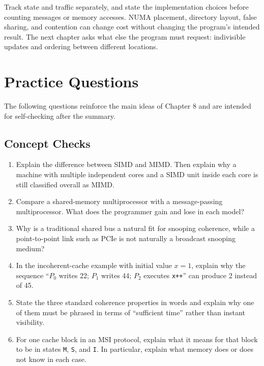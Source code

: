 Track state and traffic separately, and state the implementation choices before counting messages or memory accesses.
NUMA placement, directory layout, false sharing, and contention can change cost without changing the program's intended result.
The next chapter asks what else the program must request: indivisible updates and ordering between different locations.


\section{Practice Questions}\label{sec:ch8-practice}
The following questions reinforce the main ideas of Chapter 8 and are intended for self-checking after the summary.

\subsection*{Concept Checks}
\begin{enumerate}
    \setlength{\itemsep}{0.35em}
    \item Explain the difference between SIMD and MIMD. Then explain why a machine with multiple independent cores and a SIMD unit inside each core is still classified overall as MIMD\@.
    \item Compare a shared-memory multiprocessor with a message-passing multiprocessor.
    What does the programmer gain and lose in each model?
    \item Why is a traditional shared bus a natural fit for snooping coherence, while a point-to-point link such as PCIe is not naturally a broadcast snooping medium?
    \item In the incoherent-cache example with initial value $x=1$, explain why the sequence ``$P_0$ writes 22; $P_1$ writes 44; $P_2$ executes \texttt{x++}'' can produce 2 instead of 45.
    \item State the three standard coherence properties in words and explain why one of them must be phrased in terms of ``sufficient time'' rather than instant visibility.
    \item For one cache block in an MSI protocol, explain what it means for that block to be in states \texttt{M}, \texttt{S}, and \texttt{I}.
    In particular, explain what memory does or does not know in each case.
\end{enumerate}

